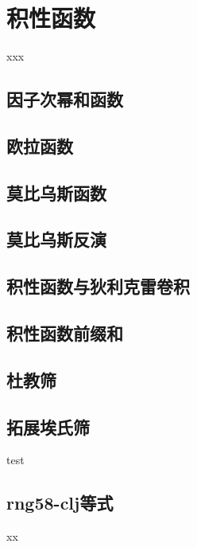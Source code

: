 \chapter{积性函数}

\begin{introduction}
	\item xxx
\end{introduction}


\section{因子次幂和函数}


\section{欧拉函数}


\section{莫比乌斯函数}


\section{莫比乌斯反演}


\section{积性函数与狄利克雷卷积}


\section{积性函数前缀和}


\section{杜教筛}


\section{拓展埃氏筛}
test

\section{rng58-clj等式}


\begin{problemset}
	\item xx
\end{problemset}